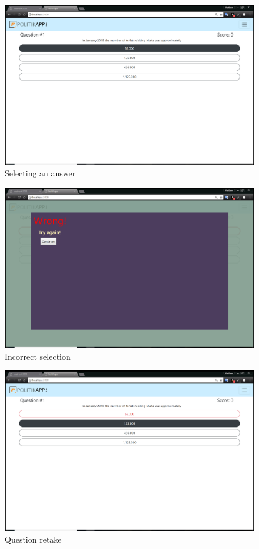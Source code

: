 \documentclass[paper=a4,fontsize=11pt]{article}
\begin{document}
\begin{figure}[H]
  \caption{Selecting an answer}
  \hfill\includegraphics[width=13cm]{Walkthrough/Q1_selection.PNG}\hspace*{\fill}
\end{figure}
\begin{figure}[H]
  \caption{Incorrect selection}
  \hfill\includegraphics[width=13cm]{Walkthrough/Q1_incorrect.PNG}\hspace*{\fill}
\end{figure}
\begin{figure}[H]
  \caption{Question retake}
  \hfill\includegraphics[width=13cm]{Walkthrough/Q1_selection2.PNG}\hspace*{\fill}
\end{figure}
\end{document}
